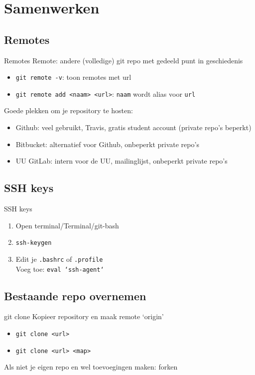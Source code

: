 \section{Samenwerken}

\subsection{Remotes}
\begin{frame}{Remotes}
	Remote: andere (volledige) git repo met gedeeld punt in geschiedenis
	\begin{itemize}
		\item \texttt{git remote -v}: toon remotes met url
		\item \texttt{git remote add <naam> <url>}: \texttt{naam} wordt alias voor \texttt{url}
	\end{itemize}
	Goede plekken om je repository te hosten:
	\begin{itemize}
		\item Github: veel gebruikt, Travis, gratis student account (private repo's beperkt)
		\item Bitbucket: alternatief voor Github, onbeperkt private repo's
		\item UU GitLab: intern voor de UU, mailinglijst, onbeperkt private repo's
	\end{itemize}
\end{frame}

\subsection{SSH keys}
\begin{frame}{SSH keys}
	\begin{enumerate}
		\item Open terminal/Terminal/git-bash
		\item \texttt{ssh-keygen}
		\item Edit je \texttt{.bashrc} of \texttt{.profile}\\
			Voeg toe: \texttt{eval `ssh-agent`}
	\end{enumerate}
\end{frame}

\subsection{Bestaande repo overnemen}
\begin{frame}{git clone}
	Kopieer repository en maak remote `origin'
	\begin{itemize}
		\item \texttt{git clone <url>}
		\item \texttt{git clone <url> <map>}
	\end{itemize}
	Als niet je eigen repo en wel toevoegingen maken: forken
\end{frame}

